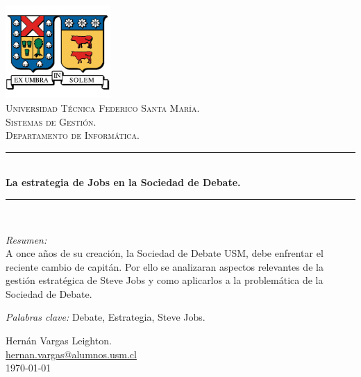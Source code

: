 \documentclass{article}
\newcommand{\HRule}{\rule{\linewidth}{0.5mm}}
\begin{document}
\begin{titlepage}
	\begin{center}
		\includegraphics[width=0.30\textwidth]{Logo_UTFSM.png}~\\[1cm]
		\textsc{\LARGE Universidad Técnica Federico Santa María.}\\[1.2cm]
		\textsc{\Large Sistemas de Gestión.}\\[0.2cm]
		\textsc{\Large Departamento de Informática.}\\[0.2cm]
	
		\HRule \\[0.4cm]
		{ \huge \bfseries La estrategia de Jobs en la Sociedad de Debate.\\[0.4cm] }
		\HRule \\[1.5cm]
		
		\begin{minipage}{0.9\textwidth}
			\large
			\emph{Resumen:} \\
			A once años de su creación, la Sociedad de Debate USM, debe
			enfrentar el reciente cambio de capitán. Por ello se analizaran aspectos
			relevantes de la gestión estratégica de Steve Jobs y como aplicarlos
			a la problemática de la Sociedad de Debate.
			\begin{flushright} 
				\emph{Palabras clave:} Debate, Estrategia, Steve Jobs.
			\end{flushright}
		\end{minipage}
		\vfill
	
		{\large Hernán Vargas Leighton.\\
		\href{mailto:hernan.vargas@alumnos.usm.cl}{hernan.vargas@alumnos.usm.cl}
		\\[0.2cm] \today }
	\end{center}
\end{titlepage}
\end{document}
